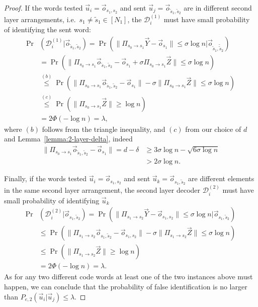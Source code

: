 \documentclass[10pt,conference]{IEEEtran}
\newcommand{\1}{\mathds{1}}
\newcommand{\cD}{\mathcal{D}}
\begin{document}
\begin{proof}
If the words tested $\vec u_i=\vec{o}_{s_1,s_2}$ and sent $\vec u_j=\vec{o}_{\tilde s_1,\tilde s_2}$ are in different second layer arrangements, i.e.~$s_1\neq\tilde s_1\in[N_1]$, the $\cD_i^{(1)}$ must have small probability of identifying the sent word:
\begin{align}
\Pr&(\cD_{i}^{(1)}|\vec{o}_{\tilde s_1,\tilde s_2})=\Pr\left(\|\Pi_{s_{0}\to s_{1}}\vec{Y}-\vec{o}_{s_1}\|\leq\sigma\log n|\vec{o}_{\tilde s_1,\tilde \tilde s_2}\right)\nonumber\\
&=\Pr\left(\|\Pi_{s_{0}\to s_{1}}\vec{o}_{\tilde s_1,\tilde s_2}-\vec{o}_{s_1}+\sigma \Pi_{s_{0}\to s_{1}}\vec{Z}\|\leq \sigma\log n\right)\nonumber\\
&\stackrel{(b)}{\leq}\Pr\left(\|\Pi_{s_{0}\to s_{1}}\vec{o}_{\tilde s_1,\tilde s_2}-\vec{o}_{s_1}\|-\sigma\|\Pi_{s_{0}\to s_{1}}\vec{Z}\|\leq\sigma\log n\right)\nonumber\\
&\stackrel{(c)}{\leq}\Pr\left(\|\Pi_{s_{0}\to s_{1}}\vec{Z}\|\geq\log n\right)\label{eq:double-layer_error_2_1}\\
&=2\Phi(-\log n)=\lambda,\nonumber
\end{align}
where $(b)$ follows from the triangle inequality, and $(c)$ from our choice of $d$ and Lemma~\ref{lemma:2-layer-delta}, indeed  
\begin{align}
\|\Pi_{s_{0}\to s_{1}}\vec{o}_{\tilde s_1,\tilde s_2}-\vec{o}_{s_1}\|=d-\delta&\geq3\sigma\log n-\sqrt{6\sigma\log n}\nonumber\\
&>2\sigma\log n.\label{eq:double-layer-delta-step}
\end{align}


Finally, if the words tested $\vec u_i=\vec{o}_{s_1,s_2}$ and sent $\vec u_k=\vec{o}_{s_1,\tilde s_2}$ are different elements in the same second layer arrangement, the second layer decoder $\cD_i^{(2)}$ must have small probability of identifying $\vec u_k$
\begin{align}
\Pr&(\cD_{i}^{(2)}|\vec{o}_{s_1,\tilde s_2})\!=\Pr\!\left(\!\|\Pi_{s_{1}\to s_{2}}\vec{Y}-\vec{o}_{s_1,s_2}\|\leq\sigma\log n|\vec{o}_{s_1,\tilde s_2}\!\right)\nonumber\\
&\!\!\leq\Pr\left(\|\Pi_{s_{1}\to s_{2}}\vec{o}_{s_1, \tilde s_2}-\vec{o}_{s_1,s_2}\|-\sigma\|\Pi_{s_{1}\to s_{2}}\vec{Z}\|\leq\sigma\log n\right)\nonumber\\
&\!\!\leq\Pr\left(\|\Pi_{s_{1}\to s_{2}}\vec{Z}\|\geq\log n\right)\label{eq:double-layer_error_2_2}\\
&\!\!=2\Phi(-\log n)=\lambda\nonumber.
\end{align}
As for any two different code words at least one of the two instances above must happen, we can conclude that the probability of false identification is no larger than $P_{e,2}(\vec u_i|\vec u_j)\leq\lambda$.


\end{proof}
\end{document}
